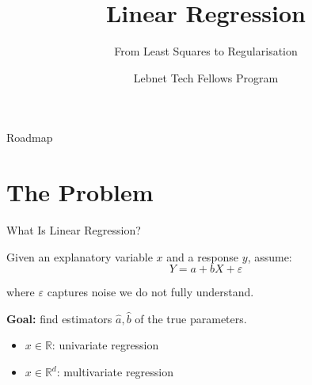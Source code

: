 \documentclass[aspectratio=169, professionalfonts]{beamer}
\title{Linear Regression}
\subtitle{From Least Squares to Regularisation}
\author{Lebnet Tech Fellows Program}
\date{}
\def\R{\mathbb{R}}
\begin{document}
\begin{frame}
\titlepage
\end{frame}

\begin{frame}{Roadmap}
\tableofcontents
\end{frame}

\section{The Problem}

\begin{frame}{What Is Linear Regression?}

Given an explanatory variable $x$ and a response $y$, assume:
$$Y = a + bX + \varepsilon$$

where $\varepsilon$ captures noise we do not fully understand.

\bigskip

\textbf{Goal:} find estimators $\hat{a}, \hat{b}$ of the true parameters.

\bigskip

\begin{itemize}
  \item $x \in \R$: univariate regression
  \item $x \in \R^d$: multivariate regression
\end{itemize}

\end{frame}
\end{document}
